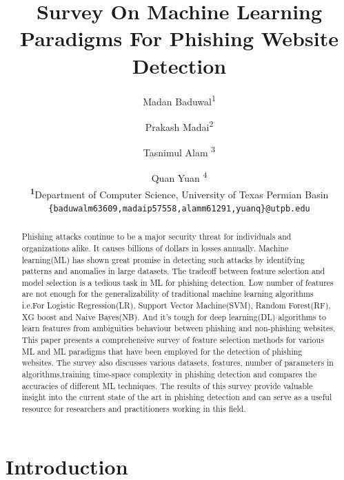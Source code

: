 \documentclass[final]{cvpr}
\begin{document}
\title{Survey On Machine Learning Paradigms For Phishing Website Detection}

\author{Madan Baduwal\textsuperscript{1}  \and Prakash Madai\textsuperscript{2} \and Tasnimul Alam \textsuperscript{3} \and Quan Yuan \textsuperscript{4} \\
\textsuperscript{\rmfamily\textbf{1}}Department of Computer Science, University of Texas Permian Basin\\
\texttt{\{baduwal\textunderscore m63609,madai\textunderscore p57558,alam\textunderscore m61291,yuan\textunderscore q\}@utpb.edu}}


\maketitle


\begin{abstract}
   Phishing attacks continue to be a major security threat for individuals and organizations alike. 
   It causes billions of dollars in losses annually.
   Machine learning(ML) has shown great promise in detecting such attacks by identifying patterns and anomalies in large datasets.
   The tradeoff between feature selection and model selection is a tedious task in ML for phishing detection. 
   Low number of features are not enough for the generalizability of traditional machine learning algorithms i.e.For Logistic Regression(LR), Support Vector Machine(SVM), Random Forest(RF), XG boost and Naive Bayes(NB). 
   And it's tough for deep learning(DL) algorithms to learn features from ambiguities behaviour between phishing and non-phishing websites. 
   This paper presents a comprehensive survey of feature selection methods for various ML and ML paradigms that have been employed for the detection of phishing websites. 
   The survey also discusses various datasets, features, number of parameters in algorithms,training time-space complexity in phishing detection and compares the accuracies of different ML techniques.
   The results of this survey provide valuable insight into the current state of the art in phishing detection and can serve as a useful resource for researchers and practitioners working in this field.

\end{abstract}

\section{Introduction}
\end{document}
